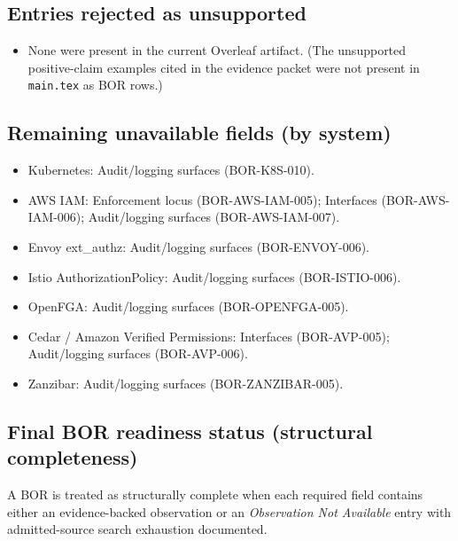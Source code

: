 \subsection*{Entries rejected as unsupported}
\begin{itemize}
  \item None were present in the current Overleaf artifact. (The unsupported positive-claim examples cited in the evidence packet were not present in \texttt{main.tex} as BOR rows.)
\end{itemize}

\subsection*{Remaining unavailable fields (by system)}
\begin{itemize}
  \item Kubernetes: Audit/logging surfaces (BOR-K8S-010).
  \item AWS IAM: Enforcement locus (BOR-AWS-IAM-005); Interfaces (BOR-AWS-IAM-006); Audit/logging surfaces (BOR-AWS-IAM-007).
  \item Envoy ext\_authz: Audit/logging surfaces (BOR-ENVOY-006).
  \item Istio AuthorizationPolicy: Audit/logging surfaces (BOR-ISTIO-006).
  \item OpenFGA: Audit/logging surfaces (BOR-OPENFGA-005).
  \item Cedar / Amazon Verified Permissions: Interfaces (BOR-AVP-005); Audit/logging surfaces (BOR-AVP-006).
  \item Zanzibar: Audit/logging surfaces (BOR-ZANZIBAR-005).
\end{itemize}

\subsection*{Final BOR readiness status (structural completeness)}
A BOR is treated as structurally complete when each required field contains either an evidence-backed observation or an \emph{Observation Not Available} entry with admitted-source search exhaustion documented.

